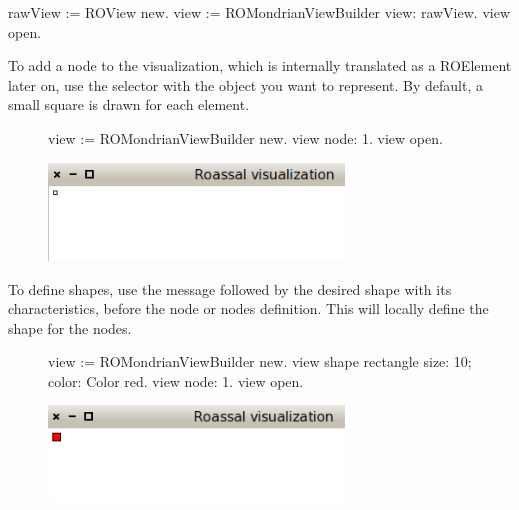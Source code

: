 \documentclass[a4paper,10pt,twoside]{book}
\begin{document}
\begin{code}{}
rawView := ROView new.
view := ROMondrianViewBuilder view: rawView.
view open.
\end{code}

To add a node to the visualization, which is internally translated as a ROElement later on, use the selector  with the object you want to represent. By default, a small square is drawn for each element.

\begin{figure}[H]
      \begin{minipage}[t]{1\textwidth}
      \vspace{0pt}
\begin{code}{}
view := ROMondrianViewBuilder new.
view node: 1.
view open.
\end{code}
   \end{minipage}
   \hfill
   \begin{minipage}[t]{1\textwidth}
	 \vspace{0pt} \raggedright
       \centering
		\includegraphics[width=0.7\textwidth]{mondrian1}
   \end{minipage}
\label{fig:mondrian1}
\end{figure} 




To define shapes, use the  message followed by the desired shape with its characteristics, before the node or nodes definition. This will locally define the shape for the nodes.

\begin{figure}[H]
      \begin{minipage}[t]{1\textwidth}
      \vspace{0pt}
\begin{code}{}
view := ROMondrianViewBuilder new.
view shape rectangle 
	size: 10;
	color: Color red.
view node: 1.
view open.
\end{code}
   \end{minipage}
   \hfill
   \begin{minipage}[t]{1\textwidth}
	 \vspace{0pt} \raggedright
       \centering
		\includegraphics[width=0.7\textwidth]{mondrian2}
   \end{minipage}
\label{fig:mondrian2}
\end{figure} 
\end{document}
